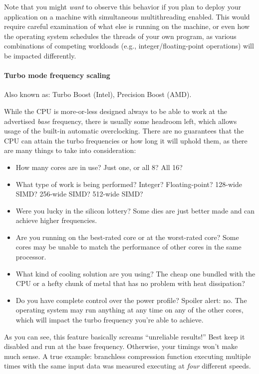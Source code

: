 \documentclass[hidelinks,titlepage,a4paper,twoside]{article}
\begin{document}
Note that you might \emph{want} to observe this behavior if you plan to deploy your application on a machine with simultaneous multithreading enabled. This would require careful examination of what else is running on the machine, or even how the operating system schedules the threads of your own program, as various combinations of competing workloads (e.g., integer/floating-point operations) will be impacted differently.

\paragraph{Turbo mode frequency scaling}

Also known as: Turbo Boost (Intel), Precision Boost (AMD).

While the CPU is more-or-less designed always to be able to work at the advertised \emph{base} frequency, there is usually some headroom left, which allows usage of the built-in automatic overclocking. There are no guarantees that the CPU can attain the turbo frequencies or how long it will uphold them, as there are many things to take into consideration:

\begin{itemize}
\item How many cores are in use? Just one, or all 8? All 16?
\item What type of work is being performed? Integer? Floating-point? 128-wide SIMD? 256-wide SIMD? 512-wide SIMD?
\item Were you lucky in the silicon lottery? Some dies are just better made and can achieve higher frequencies.
\item Are you running on the best-rated core or at the worst-rated core? Some cores may be unable to match the performance of other cores in the same processor.
\item What kind of cooling solution are you using? The cheap one bundled with the CPU or a hefty chunk of metal that has no problem with heat dissipation?
\item Do you have complete control over the power profile? Spoiler alert: no. The operating system may run anything at any time on any of the other cores, which will impact the turbo frequency you're able to achieve.
\end{itemize}

As you can see, this feature basically screams \enquote{unreliable results!} Best keep it disabled and run at the base frequency. Otherwise, your timings won't make much sense. A true example: branchless compression function executing multiple times with the same input data was measured executing at \emph{four} different speeds.
\end{document}
